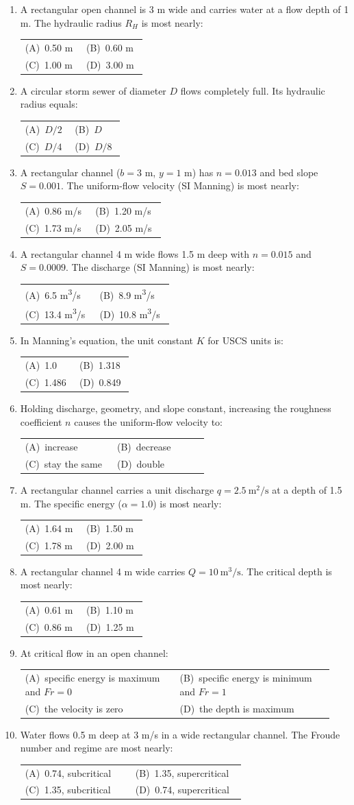 \documentclass[11pt]{article}
\makeatletter
\newcommand{\opts}[4]{%
\par\nobreak\vspace{3pt}%
\noindent\begin{tabular}{@{}p{0.47\linewidth}p{0.47\linewidth}@{}}
(A)~#1 & (B)~#2 \\[3pt]
(C)~#3 & (D)~#4 \\
\end{tabular}\par\vspace{3pt}}
\makeatother
\begin{document}
\begin{enumerate}[leftmargin=1.6em,itemsep=8pt]

\item A rectangular open channel is 3 m wide and carries water at a flow depth of 1 m. The hydraulic radius $R_H$ is most nearly:
\opts{0.50 m}{0.60 m}{1.00 m}{3.00 m}

\item A circular storm sewer of diameter $D$ flows completely full. Its hydraulic radius equals:
\opts{$D/2$}{$D$}{$D/4$}{$D/8$}

\item A rectangular channel ($b=3$ m, $y=1$ m) has $n=0.013$ and bed slope $S=0.001$. The uniform-flow velocity (SI Manning) is most nearly:
\opts{0.86 m/s}{1.20 m/s}{1.73 m/s}{2.05 m/s}

\item A rectangular channel 4 m wide flows 1.5 m deep with $n=0.015$ and $S=0.0009$. The discharge (SI Manning) is most nearly:
\opts{6.5 m\textsuperscript{3}/s}{8.9 m\textsuperscript{3}/s}{13.4 m\textsuperscript{3}/s}{10.8 m\textsuperscript{3}/s}

\item In Manning's equation, the unit constant $K$ for USCS units is:
\opts{1.0}{1.318}{1.486}{0.849}

\item Holding discharge, geometry, and slope constant, increasing the roughness coefficient $n$ causes the uniform-flow velocity to:
\opts{increase}{decrease}{stay the same}{double}

\item A rectangular channel carries a unit discharge $q=2.5~\mathrm{m^2/s}$ at a depth of 1.5 m. The specific energy ($\alpha=1.0$) is most nearly:
\opts{1.64 m}{1.50 m}{1.78 m}{2.00 m}

\item A rectangular channel 4 m wide carries $Q=10~\mathrm{m^3/s}$. The critical depth is most nearly:
\opts{0.61 m}{1.10 m}{0.86 m}{1.25 m}

\item At critical flow in an open channel:
\opts{specific energy is maximum and $Fr=0$}{specific energy is minimum and $Fr=1$}{the velocity is zero}{the depth is maximum}

\item Water flows 0.5 m deep at 3 m/s in a wide rectangular channel. The Froude number and regime are most nearly:
\opts{0.74, subcritical}{1.35, supercritical}{1.35, subcritical}{0.74, supercritical}


\end{enumerate}
\end{document}
